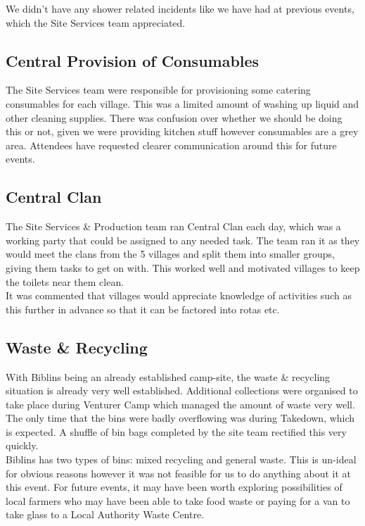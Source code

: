 We didn't have any shower related incidents like we have had at previous events, which the Site Services team appreciated.
\subsection{Central Provision of Consumables}
The Site Services team were responsible for provisioning some catering consumables for each village. This was a limited amount of washing up liquid and other cleaning supplies. There was confusion over whether we should be doing this or not, given we were providing kitchen stuff however consumables are a grey area. Attendees have requested clearer communication around this for future events.

\subsection{Central Clan}
The Site Services \& Production team ran Central Clan each day, which was a working party that could be assigned to any needed task. The team ran it as they would meet the clans from the 5 villages and split them into smaller groups, giving them tasks to get on with. This worked well and motivated villages to keep the toilets near them clean.\\

It was commented that villages would appreciate knowledge of activities such as this further in advance so that it can be factored into rotas etc.

\subsection{Waste \& Recycling}
With Biblins being an already established camp-site, the waste \& recycling situation is already very well established. Additional collections were organised to take place during Venturer Camp which managed the amount of waste very well. The only time that the bins were badly overflowing was during Takedown, which is expected. A shuffle of bin bags completed by the site team rectified this very quickly.\\

Biblins has two types of bins: mixed recycling and general waste. This is un-ideal for obvious reasons however it was not feasible for us to do anything about it at this event. For future events, it may have been worth exploring possibilities of local farmers who may have been able to take food waste or paying for a van to take glass to a Local Authority Waste Centre. \\

